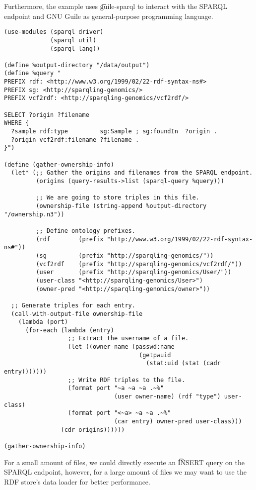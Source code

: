   Furthermore, the example uses \t{guile-sparql} to interact with the
  SPARQL endpoint and GNU Guile as general-purpose programming language.

\begin{siderules}
\begin{verbatim}
(use-modules (sparql driver)
             (sparql util)
             (sparql lang))

(define %output-directory "/data/output")
(define %query "
PREFIX rdf: <http://www.w3.org/1999/02/22-rdf-syntax-ns#>
PREFIX sg: <http://sparqling-genomics/>
PREFIX vcf2rdf: <http://sparqling-genomics/vcf2rdf/>

SELECT ?origin ?filename
WHERE {
  ?sample rdf:type         sg:Sample ; sg:foundIn  ?origin .
  ?origin vcf2rdf:filename ?filename .
}")

(define (gather-ownership-info)
  (let* (;; Gather the origins and filenames from the SPARQL endpoint.
         (origins (query-results->list (sparql-query %query)))

         ;; We are going to store triples in this file.
         (ownership-file (string-append %output-directory "/ownership.n3"))

         ;; Define ontology prefixes.
         (rdf        (prefix "http://www.w3.org/1999/02/22-rdf-syntax-ns#"))
         (sg         (prefix "http://sparqling-genomics/"))
         (vcf2rdf    (prefix "http://sparqling-genomics/vcf2rdf/"))
         (user       (prefix "http://sparqling-genomics/User/"))
         (user-class "<http://sparqling-genomics/User>")
         (owner-pred "<http://sparqling-genomics/owner>"))

  ;; Generate triples for each entry.
  (call-with-output-file ownership-file
    (lambda (port)
      (for-each (lambda (entry)
                  ;; Extract the username of a file.
                  (let ((owner-name (passwd:name
                                      (getpwuid
                                        (stat:uid (stat (cadr entry)))))))
                  ;; Write RDF triples to the file.
                  (format port "~a ~a ~a .~%"
                               (user owner-name) (rdf "type") user-class)
                  (format port "<~a> ~a ~a .~%"
                               (car entry) owner-pred user-class)))
                (cdr origins))))))

(gather-ownership-info)
\end{verbatim}
\end{siderules}

  For a small amount of files, we could directly execute an \t{INSERT}
  query on the SPARQL endpoint, however, for a large amount of files we may
  want to use the RDF store's data loader for better performance.

